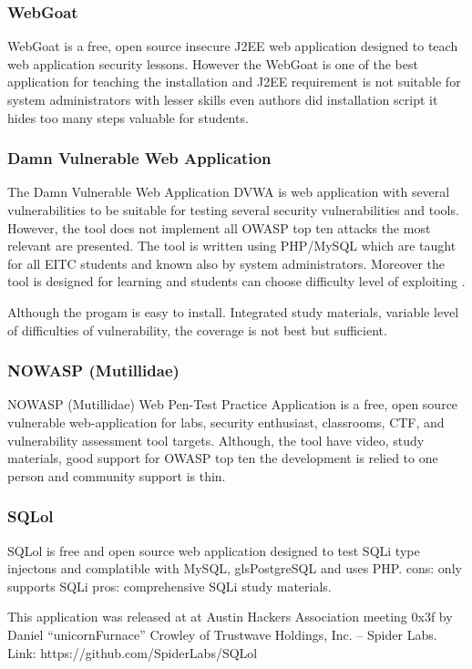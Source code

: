 \subsubsection{WebGoat}
WebGoat is a free, open source insecure J2EE web application designed to teach web application security lessons.  However the WebGoat is one of the best application for teaching the installation and J2EE requirement is not suitable for system administrators with lesser skills even authors did installation script it hides too many steps valuable for students. 


\subsubsection{Damn Vulnerable Web Application}
The Damn Vulnerable Web Application \gls{DVWA} is web application with several vulnerabilities to be suitable for testing several security vulnerabilities and tools. However, the tool does not implement all \gls{OWASP} top ten attacks the most relevant are presented. The tool is written using PHP/MySQL which are taught for all \gls{EITC} students and known also by system administrators. Moreover the tool is designed for learning and students can choose difficulty level of exploiting \citep{website:dvwa}.

Although the progam is easy to install. Integrated study materials, variable level of  difficulties of vulnerability, the coverage is not best but sufficient.

\subsubsection{NOWASP (Mutillidae)}
NOWASP (Mutillidae) Web Pen-Test Practice Application is a free, open source vulnerable web-application for labs, security enthusiast, classrooms, \gls{CTF}, and vulnerability assessment tool targets. \citep{website:Mutillidae} Although, the tool have video, study materials, good support for \gls{OWASP} top ten the development is relied to one person and community support is thin.
\subsubsection{SQLol}
SQLol is free and open source web application designed to test \gls{SQLi} type injectons and complatible with \gls{MySQL}, gls{PostgreSQL} and uses \gls{PHP}.
cons: only supports \gls{SQLi}
pros: comprehensive  \gls{SQLi} study materials.

 This application was released at at Austin Hackers Association meeting 0x3f by Daniel “unicornFurnace” Crowley of Trustwave Holdings, Inc. – Spider Labs.
Link: https://github.com/SpiderLabs/SQLol



